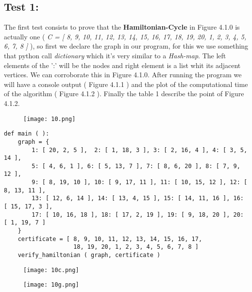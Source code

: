 \subsection{Test 1:}

The first test consists to prove that the {\bfseries Hamiltonian-Cycle} in Figure 4.1.0 is actually one ( {\itshape C = [ 8, 9, 10, 11, 12, 13, 14, 15, 16, 17, 18, 19, 20, 1, 2, 3, 4, 5, 6, 7, 8 ]} ), so first we declare the graph in our program, for this we use something that python call {\itshape dictionary} which it's very similar to a {\itshape Hash-map}. The left elements of the ':' will be the nodes and right element is a list whit its adjacent vertices. We can corroborate this in Figure 4.1.0. After running the program we will have a console output ( Figure 4.1.1 ) and the plot of the computational time of the algorithm ( Figure 4.1.2 ). Finally the table 1 describe the point of Figure 4.1.2. \hfill \break

\begin{figure}[H]
\texttt{[image: 10.png]}
\centering \linebreak {}
\end{figure} \hfill \break

\begin{lstlisting}
def main ( ):
    graph = {
        1: [ 20, 2, 5 ],  2: [ 1, 18, 3 ], 3: [ 2, 16, 4 ], 4: [ 3, 5, 14 ],
        5: [ 4, 6, 1 ], 6: [ 5, 13, 7 ], 7: [ 8, 6, 20 ], 8: [ 7, 9, 12 ],
        9: [ 8, 19, 10 ], 10: [ 9, 17, 11 ], 11: [ 10, 15, 12 ], 12: [ 8, 13, 11 ],
        13: [ 12, 6, 14 ], 14: [ 13, 4, 15 ], 15: [ 14, 11, 16 ], 16: [ 15, 17, 3 ],
        17: [ 10, 16, 18 ], 18: [ 17, 2, 19 ], 19: [ 9, 18, 20 ], 20: [ 1, 19, 7 ]
    }
    certificate = [ 8, 9, 10, 11, 12, 13, 14, 15, 16, 17,
    	            18, 19, 20, 1, 2, 3, 4, 5, 6, 7, 8 ]
    verify_hamiltonian ( graph, certificate )
\end{lstlisting} \hfill \break

\begin{figure}[H]
\texttt{[image: 10c.png]}
\centering \linebreak {}
\end{figure} \hfill \break

\begin{figure}[H]
\texttt{[image: 10g.png]}
\centering \linebreak {}
\end{figure} \hfill \break

